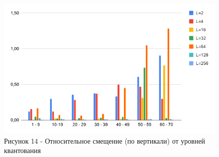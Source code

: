 \documentclass[14pt, a4paper]{article}
\begin{document}
\begin{figure}[h!]
    \centering
    \includegraphics[width = 14 cm]{tests/img/diag_rlt_disp_y.png}
    \caption*{Рисунок 14 - Относительное смещение (по вертикали) от уровней квантования}
    \label{fig:my_label}
\end{figure}
\end{document}
